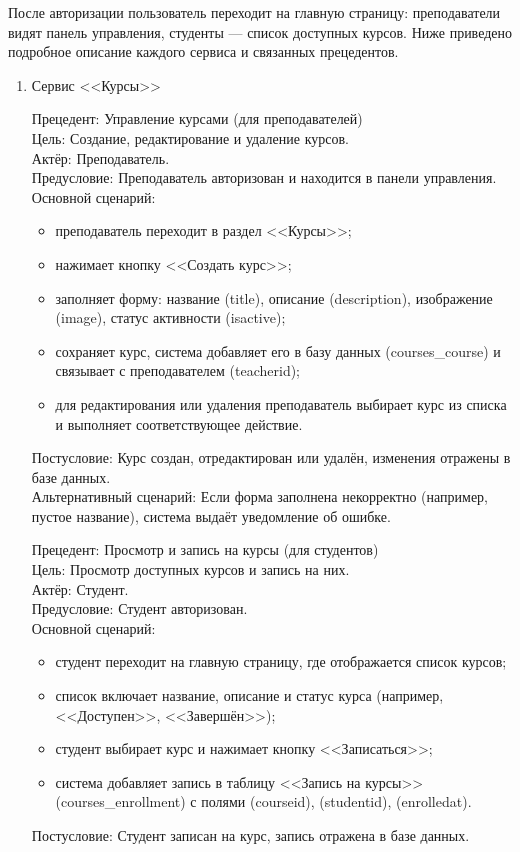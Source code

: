 После авторизации пользователь переходит на главную страницу: преподаватели видят панель управления, студенты --- список доступных курсов. Ниже приведено подробное описание каждого сервиса и связанных прецедентов.

\begin{enumerate}
	\item {Сервис <<Курсы>>}
	
	{Прецедент: Управление курсами (для преподавателей)} \\
	{Цель}: Создание, редактирование и удаление курсов. \\
	{Актёр}: Преподаватель. \\
	{Предусловие}: Преподаватель авторизован и находится в панели управления. \\
	{Основной сценарий}:
	\begin{itemize}
		\item преподаватель переходит в раздел <<Курсы>>;
		\item нажимает кнопку <<Создать курс>>;
		\item заполняет форму: название (title), описание (description), изображение (image), статус активности (isactive);
		\item сохраняет курс, система добавляет его в базу данных (courses\_course) и связывает с преподавателем (teacherid);
		\item для редактирования или удаления преподаватель выбирает курс из списка и выполняет соответствующее действие.
	\end{itemize}
	{Постусловие}: Курс создан, отредактирован или удалён, изменения отражены в базе данных. \\
	{Альтернативный сценарий}: Если форма заполнена некорректно (например, пустое название), система выдаёт уведомление об ошибке.
	
	{Прецедент: Просмотр и запись на курсы (для студентов)} \\
	{Цель}: Просмотр доступных курсов и запись на них. \\
	{Актёр}: Студент. \\
	{Предусловие}: Студент авторизован. \\
	{Основной сценарий}:
	\begin{itemize}
		\item студент переходит на главную страницу, где отображается список курсов;
		\item список включает название, описание и статус курса (например, <<Доступен>>, <<Завершён>>);
		\item студент выбирает курс и нажимает кнопку <<Записаться>>;
		\item система добавляет запись в таблицу <<Запись на курсы>> (courses\_enrollment) с полями (courseid), (studentid), (enrolledat).
	\end{itemize}
	{Постусловие}: Студент записан на курс, запись отражена в базе данных.
	

\end{enumerate}
